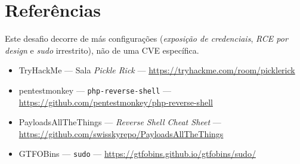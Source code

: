 \documentclass[12pt,a4paper]{article}
\begin{document}
\section{Referências}
Este desafio decorre de más configurações (\emph{exposição de credenciais},
\emph{RCE por design} e \emph{sudo} irrestrito), não de uma CVE específica.
\begin{itemize}[leftmargin=1.5em]
  \item TryHackMe --- Sala \emph{Pickle Rick} ---
        \url{https://tryhackme.com/room/picklerick}
  \item pentestmonkey --- \texttt{php-reverse-shell} ---
        \url{https://github.com/pentestmonkey/php-reverse-shell}
  \item PayloadsAllTheThings --- \emph{Reverse Shell Cheat Sheet} ---
        \url{https://github.com/swisskyrepo/PayloadsAllTheThings}
  \item GTFOBins --- \texttt{sudo} ---
        \url{https://gtfobins.github.io/gtfobins/sudo/}
\end{itemize}
\end{document}
